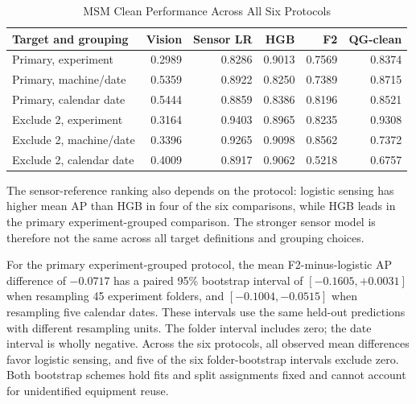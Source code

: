 \begin{table}[htbp]
\caption{MSM Clean Performance Across All Six Protocols}\label{tab:msm-sensitivity}
\centering\small
\setlength{\tabcolsep}{4pt}
\begin{tabular}{lrrrrr}\toprule
Target and grouping & Vision & Sensor LR & HGB & F2 & QG-clean\\\midrule
Primary, experiment & 0.2989 & 0.8286 & 0.9013 & 0.7569 & 0.8374\\
Primary, machine/date & 0.5359 & 0.8922 & 0.8250 & 0.7389 & 0.8715\\
Primary, calendar date & 0.5444 & 0.8859 & 0.8386 & 0.8196 & 0.8521\\
Exclude 2, experiment & 0.3164 & 0.9403 & 0.8965 & 0.8235 & 0.9308\\
Exclude 2, machine/date & 0.3396 & 0.9265 & 0.9098 & 0.8562 & 0.7372\\
Exclude 2, calendar date & 0.4009 & 0.8917 & 0.9062 & 0.5218 & 0.6757\\
\bottomrule\end{tabular}
\end{table}

The sensor-reference ranking also depends on the protocol: logistic sensing has higher
mean AP than HGB in four of the six comparisons, while HGB leads in the primary
experiment-grouped comparison. The stronger sensor model is therefore not the same
across all target definitions and grouping choices.

For the primary experiment-grouped protocol, the mean F2-minus-logistic AP difference
of $-0.0717$ has a paired 95\% bootstrap interval of $[-0.1605,+0.0031]$ when
resampling 45 experiment folders, and $[-0.1004,-0.0515]$ when resampling five calendar
dates. These intervals use the same held-out predictions with different resampling
units. The folder interval includes zero; the date interval is wholly negative. Across
the six protocols, all observed mean differences favor logistic sensing, and five of
the six folder-bootstrap intervals exclude zero. Both bootstrap schemes hold fits and
split assignments fixed and cannot account for unidentified equipment reuse.


